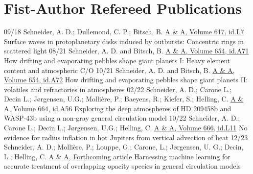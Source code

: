 \documentclass[]{friggeri-cv}
\begin{document}
\section{Fist-Author Refereed Publications}
\begin{entrylist}
  \entry
    {09/18}
    {Schneider, A. D.; Dullemond, C. P.; Bitsch, B.}
    {\href{https://arxiv.org/abs/1809.02834}{A \& A, Volume 617, id.L7}}
    {Surface waves in protoplanetary disks induced by outbursts: Concentric rings in scattered light}
  \entry
    {08/21}
    {Schneider, A. D. and Bitsch, B.}
    {\href{https://arxiv.org/abs/2105.13267}{A \& A, Volume 654, id.A71}}
    {How drifting and evaporating pebbles shape giant planets I: Heavy element content and atmospheric C/O}
  \entry
    {10/21}
    {Schneider, A. D. and Bitsch, B.}
    {\href{https://arxiv.org/abs/2109.03589}{A \& A, Volume 654, id.A72}}
    {How drifting and evaporating pebbles shape giant planets II: volatiles and refractories in atmospheres}
  \entry
    {02/22}
    {Schneider, A. D.; Carone L.; Decin L.; Jørgensen, U.G.; Mollière, P.; Baeyens, R.; Kiefer, S.; Helling, C.}
    {\href{https://arxiv.org/abs/2202.09183}{A \& A, Volume 664, id.A56}}
    {Exploring the deep atmospheres of HD 209458b and WASP-43b using a non-gray general circulation model}    
  \entry
    {10/22}
    {Schneider, A. D.; Carone L.; Decin L.; Jørgensen, U.G.; Helling, C.}
    {\href{https://arxiv.org/abs/2210.01466}{A \& A, Volume 666, id.L11}}
    {No evidence for radius inflation in hot Jupiters from vertical advection of heat}    
  \entry
  	{12/23}
    {Schneider, A. D.; Molli\`ere, P.; Louppe, G.; Carone, L.; J{\o}rgensen, U. G.; Decin, L.; Helling, C.}
    {\href{https://arxiv.org/abs/2311.00775}{A \& A, Forthcoming article}}
    {Harnessing machine learning for accurate treatment of overlapping opacity species in general circulation models}  
\end{entrylist}
\end{document}
